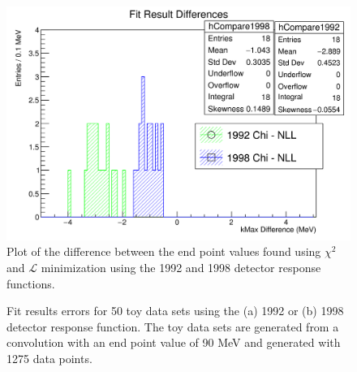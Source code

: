 \begin{figure}[h]
  \centering
  \includegraphics[width=\linewidth]{figures/png/compare_fit_results_92_v_98_unrestrictedOnly.png}
  \caption{Plot of the difference between the end point values found using $\chi^2$ and
    $\mathcal{L}$ minimization using the 1992 and 1998 detector response functions.}
  \label{fig:compareFits}
\end{figure}


\begin{figure}[h]
  \centering
  \hfill
  \caption{Fit results errors for 50 toy data sets using the (a) 1992 or (b) 1998 detector response function.
    The toy data sets are generated from a convolution with an end point value of 90 MeV and generated
    with 1275 data points.
  }
  \label{fig:ToyFitErrs}
\end{figure}



